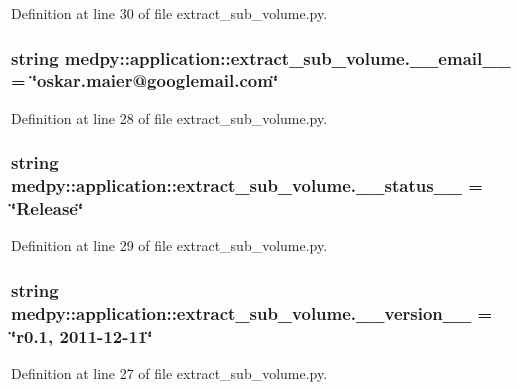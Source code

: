 Definition at line 30 of file extract\_\-sub\_\-volume.py.

\hypertarget{namespacemedpy_1_1application_1_1extract__sub__volume_a289485556bf881a1fadcccfb5a338866}{
\subsubsection[{\_\-\_\-email\_\-\_\-}]{\setlength{\rightskip}{0pt plus 5cm}string {\bf medpy::application::extract\_\-sub\_\-volume.\_\-\_\-email\_\-\_\-} = \char`\"{}oskar.maier@googlemail.com\char`\"{}}}
\label{namespacemedpy_1_1application_1_1extract__sub__volume_a289485556bf881a1fadcccfb5a338866}


Definition at line 28 of file extract\_\-sub\_\-volume.py.

\hypertarget{namespacemedpy_1_1application_1_1extract__sub__volume_aa0bc50790ac213e2eef547d1efc1edf2}{
\subsubsection[{\_\-\_\-status\_\-\_\-}]{\setlength{\rightskip}{0pt plus 5cm}string {\bf medpy::application::extract\_\-sub\_\-volume.\_\-\_\-status\_\-\_\-} = \char`\"{}Release\char`\"{}}}
\label{namespacemedpy_1_1application_1_1extract__sub__volume_aa0bc50790ac213e2eef547d1efc1edf2}


Definition at line 29 of file extract\_\-sub\_\-volume.py.

\hypertarget{namespacemedpy_1_1application_1_1extract__sub__volume_acf7abd549e8d142f01136d98f5258945}{
\subsubsection[{\_\-\_\-version\_\-\_\-}]{\setlength{\rightskip}{0pt plus 5cm}string {\bf medpy::application::extract\_\-sub\_\-volume.\_\-\_\-version\_\-\_\-} = \char`\"{}r0.1, 2011-\/12-\/11\char`\"{}}}
\label{namespacemedpy_1_1application_1_1extract__sub__volume_acf7abd549e8d142f01136d98f5258945}


Definition at line 27 of file extract\_\-sub\_\-volume.py.

